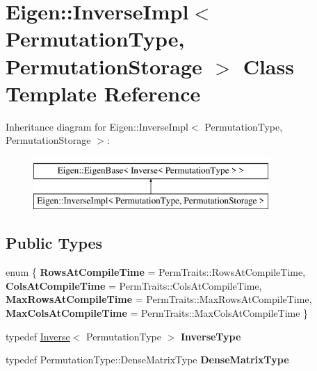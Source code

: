 \hypertarget{class_eigen_1_1_inverse_impl_3_01_permutation_type_00_01_permutation_storage_01_4}{}\section{Eigen\+::Inverse\+Impl$<$ Permutation\+Type, Permutation\+Storage $>$ Class Template Reference}
\label{class_eigen_1_1_inverse_impl_3_01_permutation_type_00_01_permutation_storage_01_4}
Inheritance diagram for Eigen\+::Inverse\+Impl$<$ Permutation\+Type, Permutation\+Storage $>$\+:\begin{figure}[H]
\begin{center}
\leavevmode
\includegraphics[height=2.000000cm]{class_eigen_1_1_inverse_impl_3_01_permutation_type_00_01_permutation_storage_01_4}
\end{center}
\end{figure}
\subsection*{Public Types}
\begin{DoxyCompactItemize}
\item 
\mbox{\label{class_eigen_1_1_inverse_impl_3_01_permutation_type_00_01_permutation_storage_01_4_a9ad43f3035d5eecbc63eaab96d771629}} 
enum \{ {\bfseries Rows\+At\+Compile\+Time} = Perm\+Traits\+::Rows\+At\+Compile\+Time, 
{\bfseries Cols\+At\+Compile\+Time} = Perm\+Traits\+::Cols\+At\+Compile\+Time, 
{\bfseries Max\+Rows\+At\+Compile\+Time} = Perm\+Traits\+::Max\+Rows\+At\+Compile\+Time, 
{\bfseries Max\+Cols\+At\+Compile\+Time} = Perm\+Traits\+::Max\+Cols\+At\+Compile\+Time
 \}
\item 
\mbox{\label{class_eigen_1_1_inverse_impl_3_01_permutation_type_00_01_permutation_storage_01_4_a9c2e8fec08e169e88e01c37cbc1ea69f}} 
typedef \mbox{\hyperlink{class_eigen_1_1_inverse}{Inverse}}$<$ Permutation\+Type $>$ {\bfseries Inverse\+Type}
\item 
\mbox{\label{class_eigen_1_1_inverse_impl_3_01_permutation_type_00_01_permutation_storage_01_4_a8596960618ffe5e72f897d0a53b35b21}} 
typedef Permutation\+Type\+::\+Dense\+Matrix\+Type {\bfseries Dense\+Matrix\+Type}
\end{DoxyCompactItemize}
